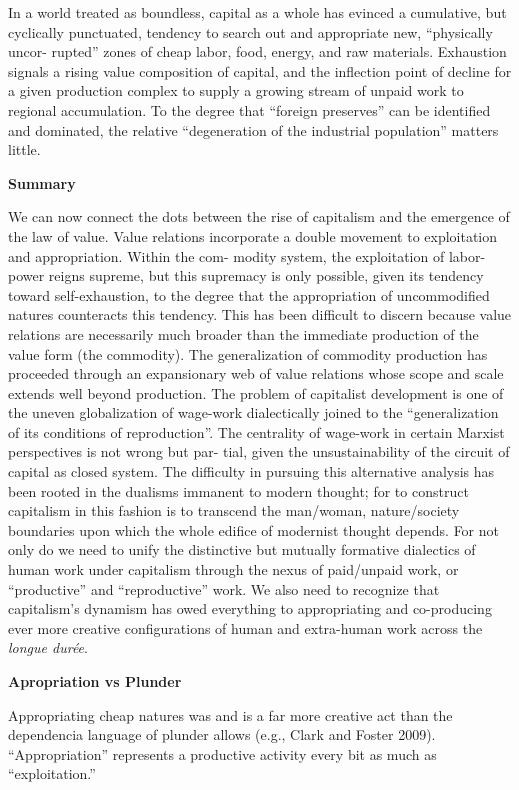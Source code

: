 \documentclass[
]{book}
\begin{document}
In a world treated as boundless, capital
as a whole has evinced a cumulative, but cyclically punctuated,
tendency to search out and appropriate new, ``physically uncor-
rupted'' zones of cheap labor, food, energy, and raw materials.
Exhaustion signals a rising value composition of capital, and the
inflection point of decline for a given production complex to supply a
growing stream of unpaid work to regional accumulation.
To the
degree that ``foreign preserves'' can be identified and dominated, the
relative ``degeneration of the industrial population'' matters little.

\textbf{Summary}

We can now connect the dots between the rise of capitalism and
the emergence of the law of value. Value relations incorporate a
double movement to exploitation and appropriation. Within the com-
modity system, the exploitation of labor-power reigns supreme, but
this supremacy is only possible, given its tendency toward
self-exhaustion, to the degree that the appropriation of uncommodified natures
counteracts this tendency. This has been difficult to discern because
value relations are necessarily much broader than the immediate
production of the value form (the commodity). The generalization of
commodity production has proceeded through an expansionary web
of value relations whose scope and scale extends well beyond production.
The problem of capitalist development is one of the uneven
globalization of wage-work dialectically joined to the ``generalization of
its conditions of reproduction''. The centrality of wage-work
in certain Marxist perspectives is not wrong but par-
tial, given the unsustainability of the circuit of capital as closed system.
The difficulty in pursuing this alternative analysis has been
rooted in the dualisms immanent to modern thought; for to construct
capitalism in this fashion is to transcend the man/woman,
nature/society boundaries upon which the whole edifice of modernist
thought depends. For not
only do we need to unify the distinctive but mutually formative
dialectics of human work under capitalism through the nexus of
paid/unpaid work, or ``productive'' and ``reproductive'' work. We also
need to recognize that capitalism's dynamism has owed everything to
appropriating and co-producing ever more creative configurations of
human and extra-human work across the \emph{longue durée}.

\textbf{Apropriation vs Plunder}

Appropriating cheap natures was and is a far more creative act
than the dependencia language of plunder allows (e.g., Clark and
Foster 2009). ``Appropriation'' represents a productive activity every
bit as much as ``exploitation.''
\end{document}
